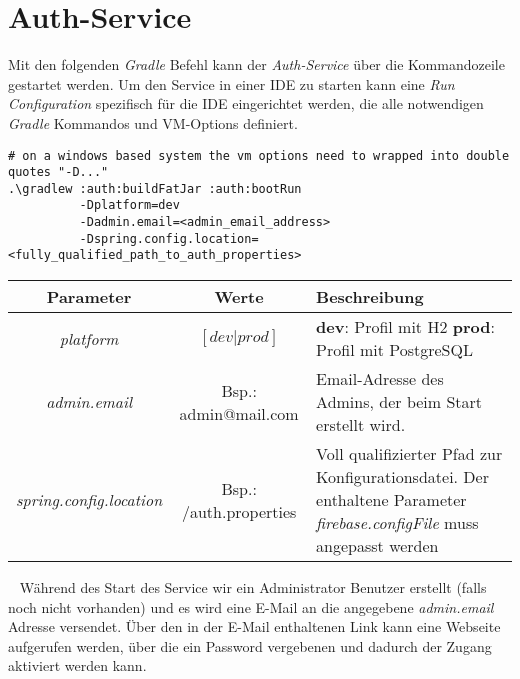 \documentclass[]{article}
\begin{document}
{\section{Auth-Service}
Mit den folgenden \emph{Gradle} Befehl kann der \emph{Auth-Service} über die Kommandozeile gestartet werden. Um den Service in einer IDE zu starten kann eine \emph{Run Configuration} spezifisch für die IDE eingerichtet werden, die alle notwendigen \emph{Gradle} Kommandos und VM-Options definiert.
\begin{verbatim}
# on a windows based system the vm options need to wrapped into double quotes "-D..."
.\gradlew :auth:buildFatJar :auth:bootRun
          -Dplatform=dev
          -Dadmin.email=<admin_email_address>                
          -Dspring.config.location=<fully_qualified_path_to_auth_properties>
\end{verbatim}
{\renewcommand{\arraystretch}{2}%
\begin{center}
	\begin{tabular}{| c | c | p{8.3cm} |}
		\hline
		\textbf{Parameter} & \textbf{Werte} & \textbf{Beschreibung}  \\ \hline
		\textit{platform} & $[dev|prod]$ & \textbf{dev}: Profil mit H2 \newline
		\textbf{prod}: Profil mit PostgreSQL
		\\ \hline
		\textit{admin.email} & Bsp.: admin@mail.com & Email-Adresse des Admins, der beim Start erstellt wird. \\ \hline
		\textit{spring.config.location} & Bsp.: /auth.properties & Voll qualifizierter Pfad zur Konfigurationsdatei.
		\newline 
		Der enthaltene Parameter \emph{firebase.configFile} muss angepasst werden 
		\\ \hline
	\end{tabular}
\end{center}
\ \newline
Während des Start des Service wir ein Administrator Benutzer erstellt (falls noch nicht vorhanden) und es wird eine E-Mail an die angegebene \emph{admin.email} Adresse versendet. Über den in der E-Mail enthaltenen Link kann eine Webseite aufgerufen werden, über die ein Password vergebenen und dadurch der Zugang aktiviert werden kann.
}}
\end{document}
